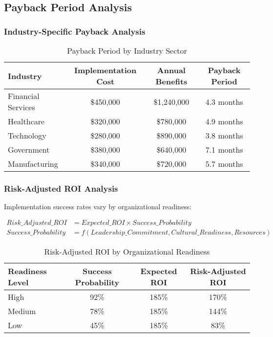 \documentclass[11pt,a4paper]{article}
\begin{document}
\subsection{Payback Period Analysis}

\subsubsection{Industry-Specific Payback Analysis}

\begin{table}[H]
\centering
\caption{Payback Period by Industry Sector}
\begin{tabular}{lccc}
\toprule
Industry & Implementation Cost & Annual Benefits & Payback Period \\
\midrule
Financial Services & \$450,000 & \$1,240,000 & 4.3 months \\
Healthcare & \$320,000 & \$780,000 & 4.9 months \\
Technology & \$280,000 & \$890,000 & 3.8 months \\
Government & \$380,000 & \$640,000 & 7.1 months \\
Manufacturing & \$340,000 & \$720,000 & 5.7 months \\
\bottomrule
\end{tabular}
\end{table}

\subsubsection{Risk-Adjusted ROI Analysis}

Implementation success rates vary by organizational readiness:

\begin{align}
Risk\_Adjusted\_ROI &= Expected\_ROI \times Success\_Probability \\
Success\_Probability &= f(Leadership\_Commitment, Cultural\_Readiness, Resources)
\end{align}

\begin{table}[H]
\centering
\caption{Risk-Adjusted ROI by Organizational Readiness}
\begin{tabular}{lccc}
\toprule
Readiness Level & Success Probability & Expected ROI & Risk-Adjusted ROI \\
\midrule
High & 92\% & 185\% & 170\% \\
Medium & 78\% & 185\% & 144\% \\
Low & 45\% & 185\% & 83\% \\
\bottomrule
\end{tabular}
\end{table}
\end{document}
